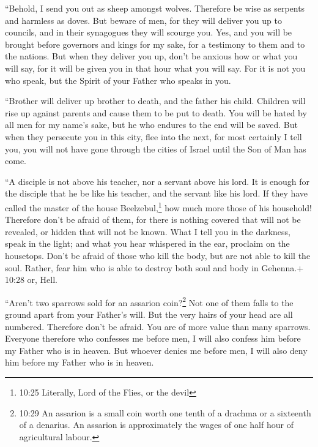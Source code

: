  ``Behold, I send you out as sheep amongst wolves.
Therefore be wise as serpents and harmless as doves.  But
beware of men, for they will deliver you up to councils, and in their
synagogues they will scourge you.  Yes, and you will be
brought before governors and kings for my sake, for a testimony to them
and to the nations.  But when they deliver you up, don't be
anxious how or what you will say, for it will be given you in that hour
what you will say.  For it is not you who speak, but the
Spirit of your Father who speaks in you.

 ``Brother will deliver up brother to death, and the father
his child. Children will rise up against parents and cause them to be
put to death.  You will be hated by all men for my name's
sake, but he who endures to the end will be saved.  But
when they persecute you in this city, flee into the next, for most
certainly I tell you, you will not have gone through the cities of
Israel until the Son of Man has come.

 ``A disciple is not above his teacher, nor a servant above
his lord.  It is enough for the disciple that he be like
his teacher, and the servant like his lord. If they have called the
master of the house Beelzebul,\footnote{10:25 Literally, Lord of the
  Flies, or the devil} how much more those of his household!
 Therefore don't be afraid of them, for there is nothing
covered that will not be revealed, or hidden that will not be known.
 What I tell you in the darkness, speak in the light; and
what you hear whispered in the ear, proclaim on the housetops.
 Don't be afraid of those who kill the body, but are not
able to kill the soul. Rather, fear him who is able to destroy both soul
and body in Gehenna.+ 10:28 or, Hell.

 ``Aren't two sparrows sold for an assarion
coin?\footnote{10:29 An assarion is a small coin worth one tenth of a
  drachma or a sixteenth of a denarius. An assarion is approximately the
  wages of one half hour of agricultural labour.} Not one of them falls
to the ground apart from your Father's will.  But the very
hairs of your head are all numbered.  Therefore don't be
afraid. You are of more value than many sparrows.  Everyone
therefore who confesses me before men, I will also confess him before my
Father who is in heaven.  But whoever denies me before men,
I will also deny him before my Father who is in heaven.

